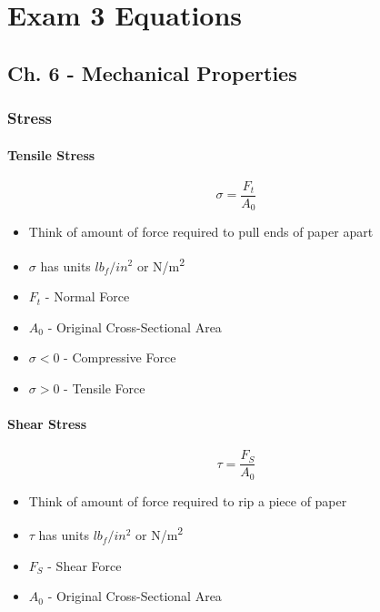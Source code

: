 \section{Exam 3 Equations} \label{sec:Exam 3 Equations}
	\subsection{Ch. 6 - Mechanical Properties} \label{subsec:Ch 6}
		\subsubsection{Stress} \label{subsubsec:Stress}
			\paragraph{Tensile Stress} \label{par:Tensile Stress}
			\begin{equation} \label{eq:Tensile Stress}
				\sigma = \frac{F_{t}}{A_{0}}
			\end{equation}
			\begin{itemize}[noitemsep]
				\item Think of amount of force required to pull ends of paper apart
				\item $\sigma$ has units $lb_{f}/in^{2}$ or \si{\newton / \meter \squared}
				\item $F_{t}$ - Normal Force
				\item $A_{0}$ - Original Cross-Sectional Area
				\item $\sigma < 0$ - Compressive Force
				\item $\sigma > 0$ - Tensile Force
			\end{itemize}
		
			\paragraph{Shear Stress} \label{par:Shear Stress}
				\begin{equation} \label{eq:Shear Stress}
					\tau = \frac{F_{S}}{A_{0}}
				\end{equation}
				\begin{itemize}[noitemsep]
					\item Think of amount of force required to rip a piece of paper
					\item $\tau$ has units $lb_{f}/in^{2}$ or \si{\newton / \meter \squared}
					\item $F_{S}$ - Shear Force
					\item $A_{0}$ - Original Cross-Sectional Area
				\end{itemize}
		
